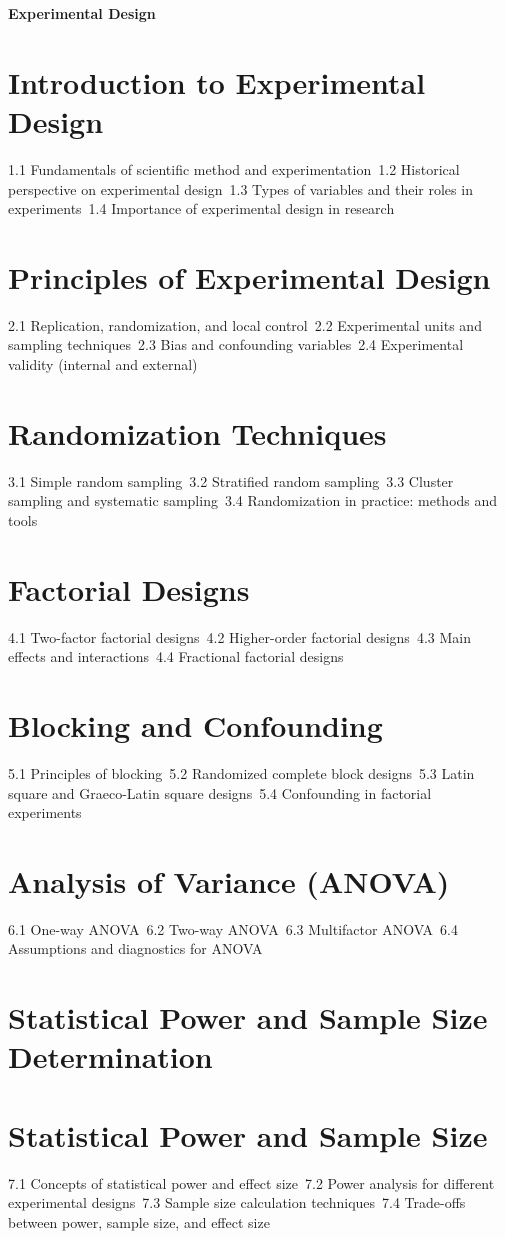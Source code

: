 {\LARGE \bf{Experimental Design}}
\section{Introduction to Experimental Design}
1.1 Fundamentals of scientific method and experimentation\
1.2 Historical perspective on experimental design\
1.3 Types of variables and their roles in experiments\
1.4 Importance of experimental design in research\
\section{Principles of Experimental Design}
2.1 Replication, randomization, and local control\
2.2 Experimental units and sampling techniques\
2.3 Bias and confounding variables\
2.4 Experimental validity (internal and external)\
\section{Randomization Techniques}
3.1 Simple random sampling\
3.2 Stratified random sampling\
3.3 Cluster sampling and systematic sampling\
3.4 Randomization in practice: methods and tools\
\section{Factorial Designs}
4.1 Two-factor factorial designs\
4.2 Higher-order factorial designs\
4.3 Main effects and interactions\
4.4 Fractional factorial designs\
\section{Blocking and Confounding}
5.1 Principles of blocking\
5.2 Randomized complete block designs\
5.3 Latin square and Graeco-Latin square designs\
5.4 Confounding in factorial experiments\
\section{Analysis of Variance (ANOVA)}
6.1 One-way ANOVA\
6.2 Two-way ANOVA\
6.3 Multifactor ANOVA\
6.4 Assumptions and diagnostics for ANOVA\
\section{Statistical Power and Sample Size Determination}
\section{Statistical Power and Sample Size}
7.1 Concepts of statistical power and effect size\
7.2 Power analysis for different experimental designs\
7.3 Sample size calculation techniques\
7.4 Trade-offs between power, sample size, and effect size\
